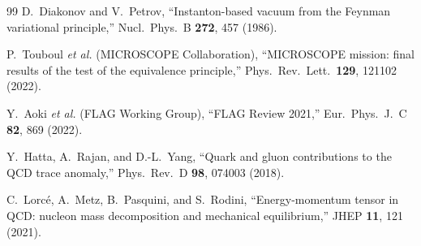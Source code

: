 \documentclass[aps,prd,twocolumn,superscriptaddress,floatfix,nofootinbib]{revtex4-2}
\begin{document}
\begin{thebibliography}{99}
D.~Diakonov and V.~Petrov,
``Instanton-based vacuum from the Feynman variational principle,''
Nucl.\ Phys.\ B \textbf{272}, 457 (1986).

P.~Touboul \emph{et al.} (MICROSCOPE Collaboration),
``MICROSCOPE mission: final results of the test of the equivalence
principle,''
Phys.\ Rev.\ Lett.\ \textbf{129}, 121102 (2022).

Y.~Aoki \emph{et al.} (FLAG Working Group),
``FLAG Review 2021,''
Eur.\ Phys.\ J.\ C \textbf{82}, 869 (2022).

Y.~Hatta, A.~Rajan, and D.-L.~Yang,
``Quark and gluon contributions to the QCD trace anomaly,''
Phys.\ Rev.\ D \textbf{98}, 074003 (2018).

C.~Lorc\'{e}, A.~Metz, B.~Pasquini, and S.~Rodini,
``Energy-momentum tensor in QCD: nucleon mass decomposition and mechanical
equilibrium,''
JHEP \textbf{11}, 121 (2021).

\end{thebibliography}
\end{document}
